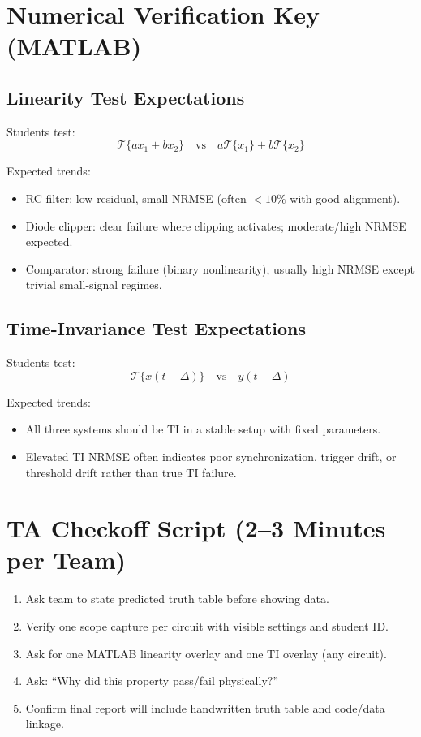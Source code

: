\documentclass[11pt,letterpaper]{article}
\begin{document}
\section{Numerical Verification Key (MATLAB)}

\subsection*{Linearity Test Expectations}
Students test:
\[
\mathcal{T}\{a x_1 + b x_2\}\quad\text{vs}\quad a\mathcal{T}\{x_1\}+b\mathcal{T}\{x_2\}
\]

Expected trends:
\begin{itemize}[leftmargin=1.2em]
    \item RC filter: low residual, small NRMSE (often \(<10\%\) with good alignment).
    \item Diode clipper: clear failure where clipping activates; moderate/high NRMSE expected.
    \item Comparator: strong failure (binary nonlinearity), usually high NRMSE except trivial small-signal regimes.
\end{itemize}

\subsection*{Time-Invariance Test Expectations}
Students test:
\[
\mathcal{T}\{x(t-\Delta)\}\quad\text{vs}\quad y(t-\Delta)
\]

Expected trends:
\begin{itemize}[leftmargin=1.2em]
    \item All three systems should be TI in a stable setup with fixed parameters.
    \item Elevated TI NRMSE often indicates poor synchronization, trigger drift, or threshold drift rather than true TI failure.
\end{itemize}

\section{TA Checkoff Script (2--3 Minutes per Team)}
\begin{enumerate}[leftmargin=1.4em]
    \item Ask team to state predicted truth table before showing data.
    \item Verify one scope capture per circuit with visible settings and student ID.
    \item Ask for one MATLAB linearity overlay and one TI overlay (any circuit).
    \item Ask: ``Why did this property pass/fail physically?''
    \item Confirm final report will include handwritten truth table and code/data linkage.
\end{enumerate}
\end{document}
